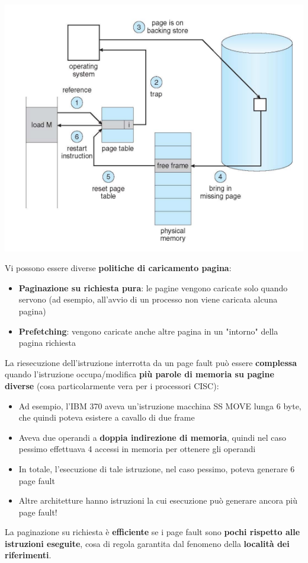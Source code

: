 \documentclass[12pt]{article}
\begin{document}
\begin{center}
    \includegraphics[width = 0.80\linewidth]{Images/69.png}
\end{center}
Vi possono essere diverse \textbf{politiche di caricamento pagina}:
\begin{itemize}
    \item \textbf{Paginazione su richiesta pura}: le pagine vengono caricate solo quando servono (ad esempio, all'avvio di un processo non viene caricata alcuna pagina)
    \item \textbf{Prefetching}: vengono caricate anche altre pagina in un "intorno" della pagina richiesta
\end{itemize}
La riesecuzione dell'istruzione interrotta da un page fault può essere \textbf{complessa} quando l'istruzione occupa/modifica \textbf{più parole di memoria su pagine diverse} (cosa particolarmente vera per i processori CISC):
\begin{itemize}
    \item Ad esempio, l'IBM 370 aveva un'istruzione macchina SS MOVE lunga 6 byte, che quindi poteva esistere a cavallo di due frame
    \item Aveva due operandi a \textbf{doppia indirezione di memoria}, quindi nel caso pessimo effettuava 4 accessi in memoria per ottenere gli operandi
    \item In totale, l'esecuzione di tale istruzione, nel caso pessimo, poteva generare 6 page fault
    \item Altre architetture hanno istruzioni la cui esecuzione può generare ancora più page fault!
\end{itemize}
La paginazione su richiesta è \textbf{efficiente} se i page fault sono \textbf{pochi rispetto alle istruzioni eseguite}, cosa di regola garantita dal fenomeno della \textbf{località dei riferimenti}.
\end{document}
